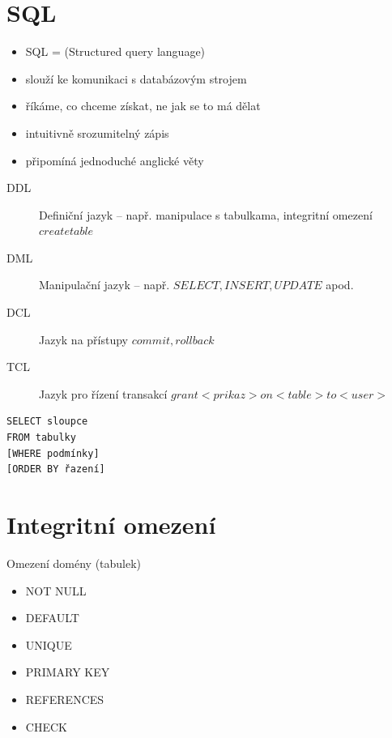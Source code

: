 \documentclass{szzclass}
\begin{document}
\section{SQL}
\begin{itemize}
  \item SQL = (Structured query language) 
  \item slouží ke komunikaci s databázovým strojem
  \item říkáme, co chceme získat, ne jak se to má dělat
  \item intuitivně srozumitelný zápis
  \item připomíná jednoduché anglické věty
\end{itemize}

\begin{description}
  \item[DDL] Definiční jazyk -- např. manipulace s tabulkama, integritní omezení $create table$
  \item[DML] Manipulační jazyk -- např. $SELECT, INSERT, UPDATE$ apod.
  \item[DCL] Jazyk na přístupy $commit, rollback$
  \item[TCL] Jazyk pro řízení transakcí $grant <prikaz> on <table> to <user>$
\end{description}

\begin{verbatim}
SELECT sloupce
FROM tabulky
[WHERE podmínky]
[ORDER BY řazení]
\end{verbatim}

\section{Integritní omezení}
Omezení domény (tabulek)
\begin{itemize}
  \item NOT NULL
  \item DEFAULT
  \item UNIQUE
  \item PRIMARY KEY
  \item REFERENCES
  \item CHECK
\end{itemize}
\end{document}
